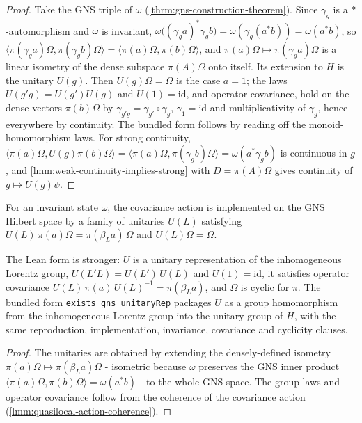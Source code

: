 \begin{proof}
    \leanok
    Take the GNS triple of $\omega$ (\ref{thrm:gns-construction-theorem}). Since $\gamma_g$ is a $*$-automorphism and $\omega$ is invariant, $\omega\big((\gamma_g a)^* \gamma_g b\big) = \omega(\gamma_g(a^* b)) = \omega(a^* b)$, so $\langle \pi(\gamma_g a)\Omega, \pi(\gamma_g b)\Omega\rangle = \langle \pi(a)\Omega, \pi(b)\Omega\rangle$, and $\pi(a)\Omega \mapsto \pi(\gamma_g a)\Omega$ is a linear isometry of the dense subspace $\pi(A)\Omega$ onto itself. Its extension to $H$ is the unitary $U(g)$. Then $U(g)\Omega = \Omega$ is the case $a = 1$; the laws $U(g'g) = U(g')U(g)$ and $U(1) = \mathrm{id}$, and operator covariance, hold on the dense vectors $\pi(b)\Omega$ by $\gamma_{g'g} = \gamma_{g'}\circ\gamma_g$, $\gamma_1 = \mathrm{id}$ and multiplicativity of $\gamma_g$, hence everywhere by continuity. The bundled form follows by reading off the monoid-homomorphism laws. For strong continuity, $\langle \pi(a)\Omega, U(g)\pi(b)\Omega\rangle = \langle \pi(a)\Omega, \pi(\gamma_g b)\Omega\rangle = \omega(a^* \gamma_g b)$ is continuous in $g$, and \ref{lmm:weak-continuity-implies-strong} with $D = \pi(A)\Omega$ gives continuity of $g \mapsto U(g)\psi$.
\end{proof}

\begin{theorem}
    \label{thrm:invariant-state-gns-unitary}
    \leanok
    For an invariant state $\omega$, the covariance action is implemented on the GNS Hilbert space by a family of unitaries $U(L)$ satisfying $U(L)\,\pi(a)\Omega = \pi(\beta_L a)\,\Omega$ and $U(L)\Omega = \Omega$.

    The Lean form is stronger: $U$ is a unitary representation of the inhomogeneous Lorentz group, $U(L'L) = U(L')\,U(L)$ and $U(1) = \mathrm{id}$, it satisfies operator covariance $U(L)\,\pi(a)\,U(L)^{-1} = \pi(\beta_L a)$, and $\Omega$ is cyclic for $\pi$. The bundled form \texttt{exists\_gns\_unitaryRep} packages $U$ as a group homomorphism from the inhomogeneous Lorentz group into the unitary group of $H$, with the same reproduction, implementation, invariance, covariance and cyclicity clauses.
\end{theorem}
\begin{proof}
    \leanok
    The unitaries are obtained by extending the densely-defined isometry $\pi(a)\Omega \mapsto \pi(\beta_L a)\Omega$ - isometric because $\omega$ preserves the GNS inner product $\langle \pi(a)\Omega, \pi(b)\Omega\rangle = \omega(a^* b)$ - to the whole GNS space. The group laws and operator covariance follow from the coherence of the covariance action (\ref{lmm:quasilocal-action-coherence}).
\end{proof}

